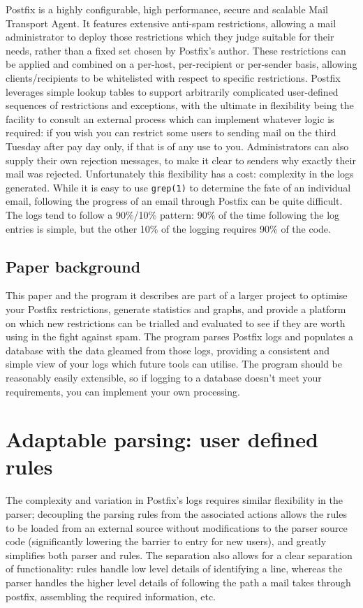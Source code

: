 \documentclass[a4paper,12pt,draft]{article}
\begin{document}
Postfix is a highly configurable, high performance, secure and scalable
Mail Transport Agent.  It features extensive anti-spam restrictions,
allowing a mail administrator to deploy those restrictions which they judge
suitable for their needs, rather than a fixed set chosen by Postfix's
author.  These restrictions can be applied and combined on a per-host,
per-recipient or per-sender basis, allowing clients/recipients to be
whitelisted with respect to specific restrictions.  Postfix leverages
simple lookup tables to support arbitrarily complicated user-defined
sequences of restrictions and exceptions, with the ultimate in flexibility
being the facility to consult an external process which can implement
whatever logic is required: if you wish you can restrict some users to
sending mail on the third Tuesday after pay day only, if that is of any use
to you.  Administrators can also supply their own rejection messages, to
make it clear to senders why exactly their mail was rejected.
Unfortunately this flexibility has a cost: complexity in the logs
generated.  While it is easy to use \texttt{grep(1)} to determine the fate
of an individual email, following the progress of an email through Postfix
can be quite difficult.  The logs tend to follow a 90\%/10\% pattern: 90\%
of the time following the log entries is simple, but the other 10\% of the
logging requires 90\% of the code.

\subsection{Paper background}

This paper and the program it describes are part of a larger project to
optimise your Postfix restrictions, generate statistics and graphs, and
provide a platform on which new restrictions can be trialled and evaluated
to see if they are worth using in the fight against spam.  The program
parses Postfix logs and populates a database with the data gleamed from
those logs, providing a consistent and simple view of your logs which
future tools can utilise.  The program should be reasonably easily
extensible, so if logging to a database doesn't meet your requirements, you
can implement your own processing.


\section{Adaptable parsing: user defined rules}

The complexity and variation in Postfix's logs requires similar flexibility
in the parser; decoupling the parsing rules from the associated actions
allows the rules to be loaded from an external source without modifications
to the parser source code (significantly lowering the barrier to entry for
new users), and greatly simplifies both parser and rules.  The separation
also allows for a clear separation of functionality: rules handle low level
details of identifying a line, whereas the parser handles the higher level
details of following the path a mail takes through postfix, assembling the
required information, etc.
\end{document}
